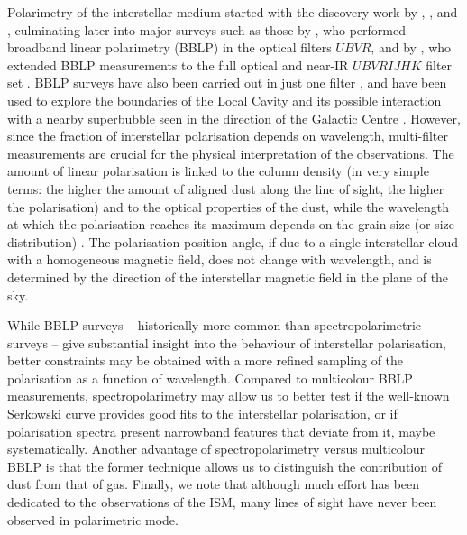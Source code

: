 \documentclass[a4paper]{aa}
\begin{document}
Polarimetry of the interstellar medium started with the discovery work
by \citet{Hiltner49}, \citet{Hall49}, and \citet{Dom49}, culminating
later into major surveys such as those by \citet{Seretal75}, who
performed broadband linear polarimetry (BBLP) in the optical filters
$UBVR$, and by \citet{Whietal92}, who extended BBLP measurements to
the full optical and near-IR $UBVRIJHK$ filter set \citep[the
    results of many BBLP surveys have been collected in a catalogue
    by][]{Heiles00}. BBLP surveys have also  been carried out in just
  one filter \citep[e.g.][]{Leroy93,Sanetal11}, and have been used to
  explore the boundaries of the Local Cavity
  \citep{Leroy99,Sanetal11} and its possible interaction with a
  nearby superbubble seen in the direction of the Galactic Centre
  \citep{Sanetal11}. However, since the fraction of interstellar
polarisation depends on wavelength, multi-filter measurements are
crucial for the physical interpretation of the observations. The
amount of linear polarisation is linked to the column density (in very
simple terms: the higher the amount of aligned dust along the line of sight, the higher the
polarisation) and to the optical properties of the dust, while the
wavelength at which the polarisation reaches its maximum depends on
the grain size (or size distribution) \citep{Caretal73}. The
polarisation position angle, if due to a single interstellar cloud
with a homogeneous magnetic field, does not change with wavelength,
and is determined by the direction of the interstellar magnetic field
in the plane of the sky.

While BBLP surveys -- historically more common than
spectropolarimetric surveys -- give substantial insight into the
behaviour of interstellar polarisation, better constraints may be
obtained with a more refined sampling of the polarisation as a function
of wavelength. Compared to multicolour BBLP measurements,
spectropolarimetry may allow us to better test if the well-known
Serkowski curve provides good fits to the interstellar polarisation,
or if polarisation spectra present narrowband features that deviate
from it, maybe systematically. Another advantage of spectropolarimetry
versus multicolour BBLP is that the former technique allows us to
distinguish the contribution of  dust from that of gas.
Finally, we note that although much effort has been dedicated to
the observations of the ISM, many lines of sight have never been
observed in polarimetric mode.
\end{document}
